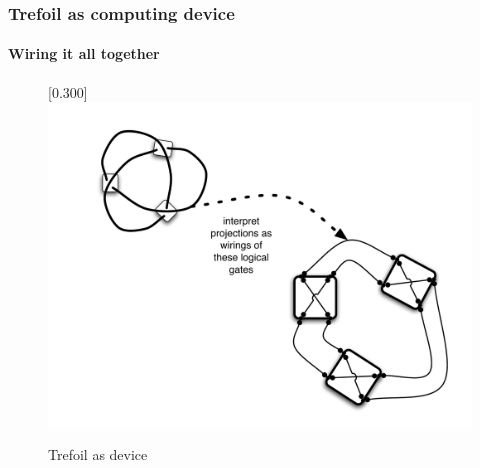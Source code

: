 \documentclass{beamer}
\begin{document}
\begin{frame}
  \frametitle{Trefoil as computing device}
  \framesubtitle{Wiring it all together}
  \begin{figure}[tbp]
    \centering
    \scalebox{0.30}[0.300]{\includegraphics[viewport=30 30 810 550]{TrefoilMethodIllustrationStepThree21072006}}
    \caption{ Trefoil as device }
  \end{figure}
\end{frame}
\end{document}
